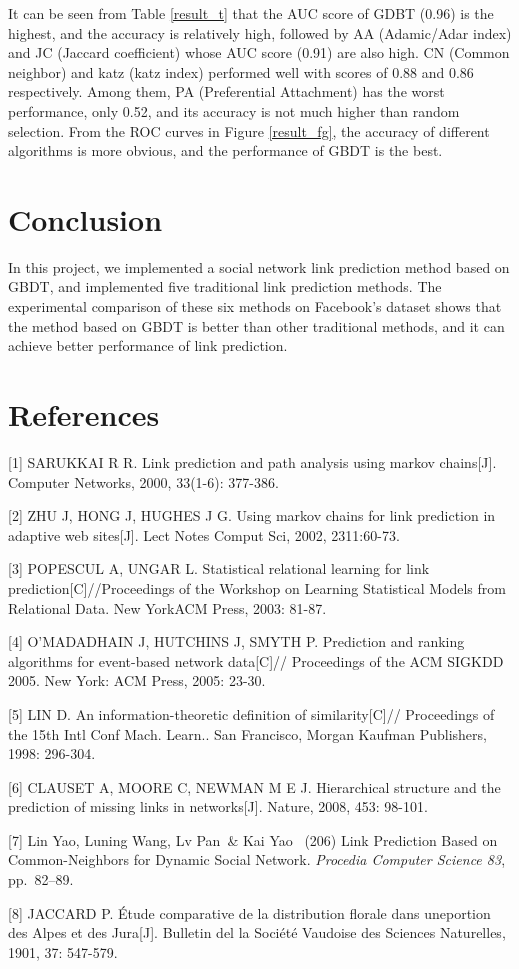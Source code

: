\documentclass{article}
\begin{document}
It can be seen from Table \ref{result_t} that the AUC score of GDBT (0.96) is the highest, and the accuracy is relatively high, followed by AA (Adamic/Adar index) and JC (Jaccard coefficient) whose AUC score (0.91) are also high. CN (Common neighbor) and katz (katz index) performed well with scores of 0.88 and 0.86 respectively. Among them, PA (Preferential Attachment) has the worst performance, only 0.52, and its accuracy is not much higher than random selection. From the ROC curves in Figure \ref{result_fg}, the accuracy of different algorithms is more obvious, and the performance of GBDT is the best.

\section{Conclusion}
In this project, we implemented a social network link prediction method based on GBDT, and implemented five traditional link prediction methods. The experimental comparison of these six methods on Facebook's dataset shows that the method based on GBDT is better than other traditional methods, and it can achieve better performance of link prediction.


\section*{References}


\small

[1] SARUKKAI R R. Link prediction and path analysis using markov chains[J]. Computer Networks, 2000, 33(1-6): 377-386.


[2]  ZHU J, HONG J, HUGHES J G. Using markov chains for link prediction in adaptive web sites[J]. Lect Notes Comput Sci, 2002, 2311:60-73.


[3]  POPESCUL A, UNGAR L. Statistical relational learning for link prediction[C]//Proceedings of the Workshop on Learning Statistical Models from Relational Data. New YorkACM Press, 2003: 81-87.


[4]  O’MADADHAIN J, HUTCHINS J, SMYTH P. Prediction and ranking algorithms for event-based network data[C]// Proceedings of the ACM SIGKDD 2005. New York: ACM Press, 2005: 23-30.


[5] LIN D. An information-theoretic definition of similarity[C]// Proceedings of the 15th Intl Conf Mach. Learn.. San Francisco, Morgan Kaufman Publishers, 1998: 296-304.


[6] CLAUSET A, MOORE C, NEWMAN M E J. Hierarchical structure and the prediction of missing links in networks[J]. Nature, 2008, 453: 98-101. 


[7]  Lin Yao, Luning Wang, Lv Pan\ \& Kai Yao \ (206) Link Prediction Based on Common-Neighbors for Dynamic Social Network. {\it Procedia Computer Science 83}, pp.\ 82--89.

[8] JACCARD P. Étude comparative de la distribution florale dans uneportion des Alpes et des Jura[J]. Bulletin del la Société Vaudoise des Sciences Naturelles, 1901, 37: 547-579.
\end{document}

